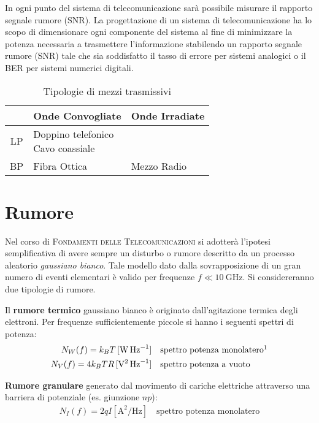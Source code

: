 In ogni punto del sistema di telecomunicazione sarà possibile misurare il rapporto segnale rumore (\ac{SNR}). La progettazione di un sistema di telecomunicazione ha lo scopo di dimensionare ogni componente del sistema al fine di minimizzare la potenza necessaria a trasmettere l'informazione stabilendo un rapporto segnale rumore (\ac{SNR}) tale che sia soddisfatto il tasso di errore per sistemi analogici o il \ac{BER} per sistemi numerici digitali.

\begin{table}[!ht]\centering
	\begin{tabular}{c|p{}|p{}}
		\hline \rule[-2ex]{0pt}{5.5ex}  & Onde Convogliate & Onde Irradiate \\ 
		\hline \rule[-2ex]{0pt}{5.5ex} \textsc{LP} & \parbox[c]{5cm}{Doppino telefonico\\ Cavo coassiale} &  \\ 
		\hline \rule[-2ex]{0pt}{5.5ex} \textsc{BP} & Fibra Ottica & Mezzo Radio \\ 
		\hline 
	\end{tabular} 
	\caption{Tipologie di mezzi trasmissivi}\label{tab:mezzi-trasmissivi}
\end{table}

\section{Rumore}
Nel corso di \textsc{Fondamenti delle Telecomunicazioni} si adotterà l'ipotesi semplificativa di avere sempre un disturbo o rumore descritto da un processo aleatorio \emph{gaussiano bianco}. Tale modello dato dalla sovrapposizione di un gran numero di eventi elementari è valido per frequenze $f\ll\SI{10}{\giga\hertz}$. Si considereranno due tipologie di rumore.

\begin{definizione}
Il \textbf{rumore termico} gaussiano bianco è originato dall'agitazione termica degli elettroni. Per frequenze sufficientemente piccole si hanno i seguenti spettri di potenza:
\begin{equation}\begin{split}
N_W(f)=k_B T \,[\si{\watt\per\hertz}] &\quad \text{spettro potenza monolatero}\footnotemark\\
N_V(f)=4 k_B T R \,[\si{\volt\squared\per\hertz}] &\quad \text{spettro potenza a vuoto}
\end{split}\end{equation}
\end{definizione}
\begin{definizione}
\textbf{Rumore granulare} generato dal movimento di cariche elettriche attraverso una barriera di potenziale (es. giunzione $np$):
\begin{equation}\begin{split} N_I(f)= 2 q I [\si{\ampere\squared\per\hertz}]\quad\text{spettro potenza monolatero} \end{split}\end{equation}
\end{definizione}

